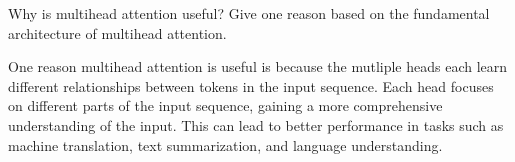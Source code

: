 Why is multihead attention useful? Give one reason based on the fundamental architecture of multihead attention.

\begin{tcolorbox}
One reason multihead attention is useful is because the mutliple heads each learn different relationships between tokens in the input sequence. Each head focuses on different parts of the input sequence, gaining a more comprehensive understanding of the input. This can lead to better performance in tasks such as machine translation, text summarization, and language understanding.
\end{tcolorbox}
